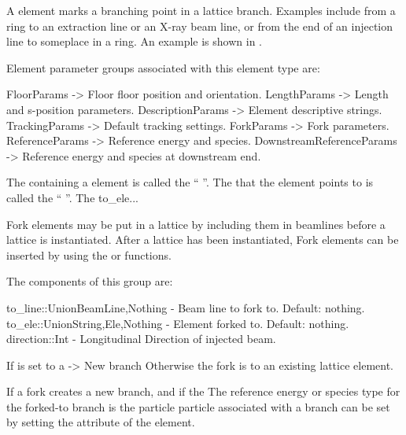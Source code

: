 A  element marks a branching point in a lattice branch. Examples include  from
a ring to an extraction line or an X-ray beam line, or  from the end of an injection line to
someplace in a ring. An example is shown in .

Element parameter groups associated with this element type are:
\TOPrule
\begin{example}
  FloorParams         -> Floor floor position and orientation.  
  LengthParams        -> Length and s-position parameters.  
  DescriptionParams   -> Element descriptive strings.  
  TrackingParams      -> Default tracking settings.  
  ForkParams          -> Fork parameters. 
  ReferenceParams     -> Reference energy and species. 
  DownstreamReferenceParams -> Reference energy and species at downstream end. 
\end{example}
\BOTTOMrule

The  containing a  element is called the
`` ''. The  that the  element points to is called the
`` ''. The to_ele...

Fork elements may be put in a lattice by including them in beamlines before a lattice
is instantiated. After a lattice has been instantiated, Fork elements can be inserted
by using the  or  functions.

The components of this group are:
\begin{example}
  to_line::Union{BeamLine,Nothing}  - Beam line to fork to. Default: nothing.
  to_ele::Union{String,Ele,Nothing} - Element forked to. Default: nothing.
  direction::Int                    - Longitudinal Direction of injected beam.
\end{example}

If  is set to a  -> New branch
Otherwise the fork is to an existing lattice element.




If a fork creates a new branch, and if the The reference energy or species type for the forked-to branch is the particle 
particle associated with a branch can be set by setting the  attribute of the 
element.


